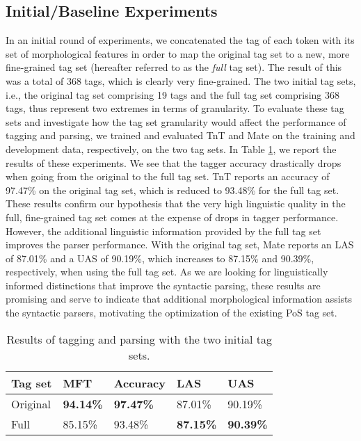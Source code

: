 \documentclass[11pt,a4paper]{article}
\begin{document}
\subsection{Initial/Baseline Experiments}
In an initial round of experiments, we concatenated the tag of each token with
its set of morphological features in order to map the original tag set to a
new, more fine-grained tag set (hereafter referred to as the \emph{full} tag
set). The result of this was a total of 368 tags, which is clearly very
fine-grained. The two initial tag sets, i.e., the original tag set comprising
19 tags and the full tag set comprising 368 tags, thus represent two extremes
in terms of granularity.  To evaluate these tag sets and investigate how the tag
set granularity would affect the performance of tagging and parsing, we trained
and evaluated TnT and Mate on the training and development data, respectively,
on the two tag sets. In Table \ref{inittagseteval}, we report the results of
these experiments. We see that the tagger accuracy drastically drops when going
from the original to the full tag set. TnT reports an accuracy of 97.47\% on
the original tag set, which is reduced to 93.48\% for the full tag set. These
results confirm our hypothesis that the very high linguistic quality in the
full, fine-grained tag set comes at the expense of drops in tagger performance.
However, the additional linguistic information provided by the full tag set
improves the parser performance. With the original tag set, Mate reports an LAS
of 87.01\% and a UAS of 90.19\%, which increases to 87.15\% and 90.39\%,
respectively, when using the full tag set. As we are looking for linguistically
informed distinctions that improve the syntactic parsing, these results are
promising and serve to indicate that additional morphological information
assists the syntactic parsers, motivating the optimization of the existing PoS
tag set.

\begin{table}
    \centering
    \smaller[0.5]
    \begin{tabular}{@{}lllll@{}}
        \toprule
        \textbf{Tag set} & \textbf{MFT} & \textbf{Accuracy} &
        \textbf{LAS} & \textbf{UAS} \\
        \midrule
        Original & \textbf{94.14\%} & \textbf{97.47\%} & 87.01\% & 90.19\% \\
        Full & 85.15\% & 93.48\% & \textbf{87.15\%} & \textbf{90.39\%} \\
        \bottomrule
    \end{tabular}
    \caption{Results of tagging and parsing with the two initial tag sets.}
    \label{inittagseteval}
\end{table}
\end{document}
